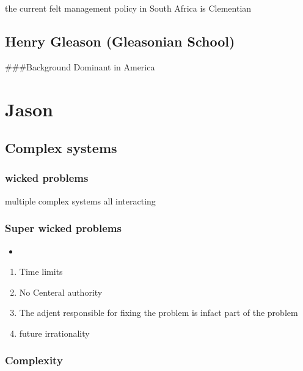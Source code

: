 \documentclass[]{article}
\providecommand{\tightlist}{%
  \setlength{\itemsep}{0pt}\setlength{\parskip}{0pt}}
\begin{document}
the current felt management policy in South Africa is Clementian

\hypertarget{henry-gleason-gleasonian-school}{%
\subsection{Henry Gleason (Gleasonian
School)}\label{henry-gleason-gleasonian-school}}

\#\#\#Background Dominant in America

\hypertarget{jason}{%
\section{Jason}\label{jason}}

\hypertarget{complex-systems-1}{%
\subsection{Complex systems}\label{complex-systems-1}}

\hypertarget{wicked-problems}{%
\subsubsection{wicked problems}\label{wicked-problems}}

multiple complex systems all interacting

\hypertarget{super-wicked-problems}{%
\subsubsection{Super wicked problems}\label{super-wicked-problems}}

\begin{itemize}
\item
\end{itemize}

\begin{enumerate}
\def\labelenumi{\arabic{enumi}.}
\tightlist
\item
  Time limits
\item
  No Centeral authority
\item
  The adjent responsible for fixing the problem is infact part of the
  problem
\item
  future irrationality
\end{enumerate}

\hypertarget{complexity}{%
\subsubsection{Complexity}\label{complexity}}
\end{document}
